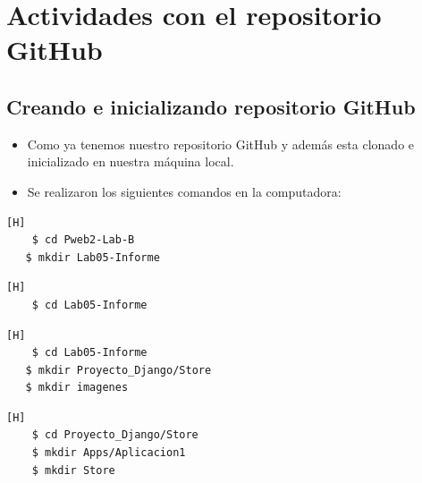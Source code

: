\section{Actividades con el repositorio GitHub}

\subsection{Creando e inicializando repositorio GitHub}
\begin{itemize}	
	\item Como ya tenemos nuestro repositorio GitHub y además esta clonado e inicializado en nuestra máquina local.
	\item Se realizaron los siguientes comandos en la computadora:
\end{itemize}	

\begin{lstlisting}[language=bash,caption={Creando carpeta de trabajo dentro de nuestro repositorio clonado en mi maquina local}][H]
	$ cd Pweb2-Lab-B
   $ mkdir Lab05-Informe
\end{lstlisting}
\begin{lstlisting}[language=bash,caption={Dirijíéndonos a la carpeta de trabajo}][H]
	$ cd Lab05-Informe
\end{lstlisting}	
\begin{lstlisting}[language=bash,caption={Creando carpetas que contendrán el proyecto e imagenes}][H]
	$ cd Lab05-Informe
   $ mkdir Proyecto_Django/Store
   $ mkdir imagenes
\end{lstlisting}
\begin{lstlisting}[language=bash,caption={Dentro de la carpeta Proyecto_Django/Store, tendremos dos carpetas más Apps/Aplicacion1 y Store}][H]
	$ cd Proyecto_Django/Store
	$ mkdir Apps/Aplicacion1
	$ mkdir Store
\end{lstlisting}

